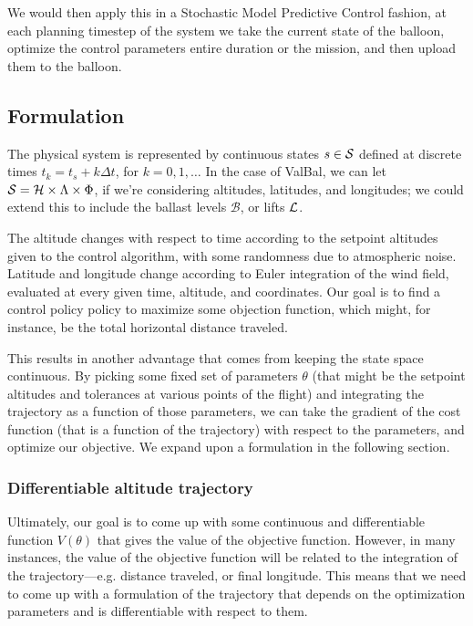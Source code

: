 \documentclass[11pt]{scrartcl} %
\begin{document}
We would then apply this in a Stochastic Model Predictive Control fashion, at each planning timestep of the system we take the current state of the balloon, optimize the control parameters entire duration or the mission, and then upload them to the balloon.

\subsection{Formulation}
The physical system is represented by continuous states $s\in\mathcal{S}$ defined at discrete times $t_k=t_s + k \Delta t$, for $k=0,1,\dots$ In the case of ValBal, we can let $\mathcal{S}=\mathcal{H}\times\Lambda\times\Phi$, if we're considering altitudes, latitudes, and longitudes; we could extend this to include the ballast levels $\mathcal{B}$, or lifts $\mathcal{L}$.

The altitude changes with respect to time according to the setpoint altitudes given to the control algorithm, with some randomness due to atmospheric noise. Latitude and longitude change according to Euler integration of the wind field, evaluated at every given time, altitude, and coordinates. Our goal is to find a control policy policy  to maximize some objection function, which might, for instance, be the total horizontal distance traveled.

This results in another advantage that comes from keeping the state space continuous. By picking some fixed set of parameters $\theta$ (that might be the setpoint altitudes and tolerances at various points of the flight) and integrating the trajectory as a function of those parameters, we can take the gradient of the cost function (that is a function of the trajectory) with respect to the parameters, and optimize our objective. We expand upon a formulation in the following section.

\subsubsection{Differentiable altitude trajectory}
Ultimately, our goal is to come up with some continuous and differentiable function $V(\theta)$ that gives the value of the objective function. However, in many instances, the value of the objective function will be related to the integration of the trajectory---e.g. distance traveled, or final longitude. This means that we need to come up with a formulation of the trajectory that depends on the optimization parameters and is differentiable with respect to them.
\end{document}
